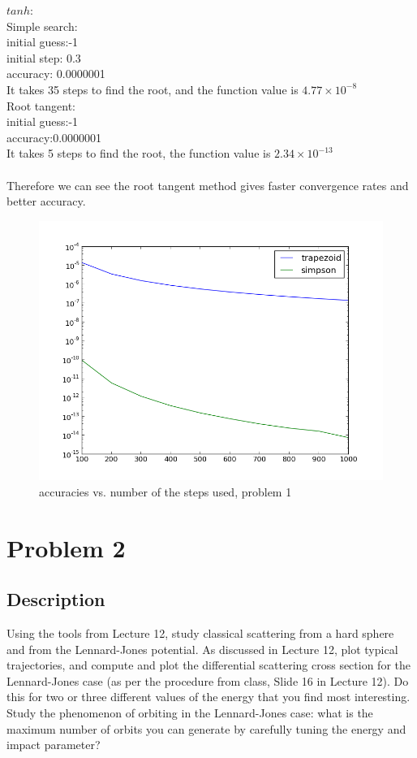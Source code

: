 \documentclass[11pt,letterpaper]{article}
\begin{document}
$tanh$:\\	Simple search:\\		initial guess:-1\\   initial step: 0.3\\		accuracy: 0.0000001\\
	It takes 35 steps to find the root, and the function value is $4.77\times10^{-8}$\\
	Root tangent:\\		initial guess:-1\\		accuracy:0.0000001\\
	It takes 5 steps to find the root, the function value is $2.34\times10^{-13}$
\\\\
Therefore we can see the root tangent method gives faster convergence rates and better accuracy.

\begin{figure}
\begin{center}
\includegraphics[width=0.9\linewidth,angle=0]{p1accuracy.png}
\caption{accuracies vs. number of the steps used, problem 1}
\label{figure1}
\end{center}
\end{figure}


\section{Problem 2}

\subsection{Description}

Using the tools from Lecture 12, study classical scattering from a hard sphere and from the Lennard-Jones potential. As discussed in Lecture 12, plot typical trajectories, and compute and plot the differential scattering cross section for the Lennard-Jones case (as per the procedure from class, Slide 16 in Lecture 12). Do this for two or three different values of the energy that you find most interesting. Study the phenomenon of orbiting in the Lennard-Jones case: what is the maximum number of orbits you can generate by carefully tuning the energy and impact parameter?
\end{document}
